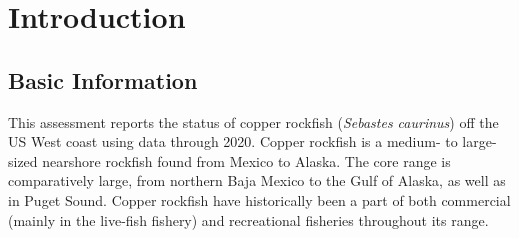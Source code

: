 \documentclass[11pt,
  english,
  a4paper,
]{article}
\begin{document}
\newcommand{\lt}{\ensuremath <}
\newcommand{\gt}{\ensuremath >}

\newlength{\cslhangindent}
\setlength{\cslhangindent}{1.5em}
\newenvironment{cslreferences}%
  {\setlength{\parindent}{0pt}%
  \everypar{\setlength{\hangindent}{\cslhangindent}}\ignorespaces}%
  {\par}

\pagebreak
{}
\setcounter{page}{1}
\renewcommand{\thetable}{\roman{table}}
\renewcommand{\thefigure}{\roman{figure}}

\pagebreak
\setlength{\parskip}{5mm plus1mm minus1mm}
\setcounter{page}{1}
\renewcommand{\thefigure}{\arabic{figure}}
\renewcommand{\thetable}{\arabic{table}}
\setcounter{table}{0}
\setcounter{figure}{0}


\hypertarget{introduction}{%
\section{Introduction}\label{introduction}}

\leavevmode\tagmcend\tagstructend


\hypertarget{basic-information}{%
\subsection{Basic Information}\label{basic-information}}

\leavevmode\tagmcend\tagstructend


This assessment reports the status of copper rockfish (\emph{Sebastes caurinus}) off the US West coast using data through 2020. Copper rockfish is a medium- to large-sized nearshore rockfish found from Mexico to Alaska. The core range is comparatively large, from northern Baja Mexico to the Gulf of Alaska, as well as in Puget Sound. Copper rockfish have historically been a part of both commercial (mainly in the live-fish fishery) and recreational fisheries throughout its range.

\leavevmode\tagmcend\tagstructend\par

\end{document}
